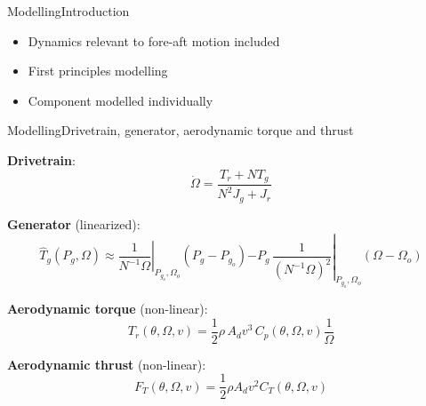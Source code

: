 \begin{frame}{Modelling}{Introduction}
	\begin{itemize}
		\item Dynamics relevant to fore-aft motion included
		\item First principles modelling
		\item Component modelled individually
	\end{itemize}
\end{frame}


\begin{frame}{Modelling}{Drivetrain, generator, aerodynamic torque and thrust}
	
	\textbf{Drivetrain}:
	\begin{equation}\label{drivetrain}
		\dot{\Omega} = \dfrac{T_{r} + N T_{g}}{N^2 J_{g} + J_{r}}
	\end{equation}
	
	\textbf{Generator} (linearized):
	\begin{equation}
		\hat T_g(P_g, \Omega) \approx \left. \dfrac{1}{N^{-1} \Omega} \right |_{P_{g_o},\Omega_o} (P_g - P_{g_o})
		\left. - P_g \, \dfrac{1}{\left( N^{-1} \Omega \right)^2} \right |_{P_{g_o},\Omega_o} (\Omega - \Omega_o)
	\end{equation}

	\textbf{Aerodynamic torque} (non-linear):
	\begin{equation}\label{eq:comp_Mrot_wind}
		T_r(\theta, \Omega, v) = \dfrac{1}{2} \rho \, A_d v^3 \, C_p(\theta, \Omega, v) \dfrac{1}{\Omega}
	\end{equation}

	\textbf{Aerodynamic thrust} (non-linear):
	\begin{equation} \label{eq:comp_aero_thrust}
		F_T(\theta, \Omega, v) = \dfrac{1}{2} \rho A_d v^2 C_T(\theta, \Omega, v)
	\end{equation}
\end{frame}



